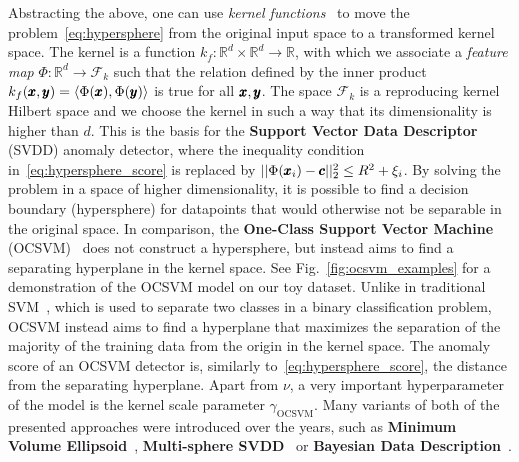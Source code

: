 Abstracting the above, one can use \textit{kernel functions}~\cite{shawe2004kernel} to move the problem~\eqref{eq:hypersphere} from the original input space to a transformed kernel space. The kernel is a function $k_f:\mathbb{R}^d \times \mathbb{R}^d \rightarrow \mathbb{R}$, with which we associate a \textit{feature map} $\Phi: \mathbb{R}^d \rightarrow \mathcal{F}_k$ such that the relation defined by the inner product $k_f(\pmb{{x}},\pmb{{y}})=\langle \Phi(\pmb{{x}}), \Phi(\pmb{{y}}) \rangle$ is true for all $\pmb{{x}},\pmb{{y}}$. The space $\mathcal{F}_k$ is a reproducing kernel Hilbert space and we choose the kernel in such a way that its dimensionality is higher than $d$. This is the basis for the \textbf{Support Vector Data Descriptor} (SVDD) anomaly detector, where the inequality condition in~\eqref{eq:hypersphere_score} is replaced by $\vert \vert \Phi(\pmb{{x}}_i) - \pmb{{c}} \vert \vert_2^2 \leq R^2 + \xi_i$. By solving the problem in a space of higher dimensionality, it is possible to find a decision boundary (hypersphere) for datapoints that would otherwise not be separable in the original space. In comparison, the \textbf{One-Class Support Vector Machine} (OCSVM)~\cite{scholkopf2001estimating} does not construct a hypersphere, but instead aims to find a separating hyperplane in the kernel space. See Fig.~\ref{fig:ocsvm_examples} for a demonstration of the OCSVM model on our toy dataset.  Unlike in traditional SVM~\cite{cortes1995support}, which is used to separate two classes in a binary classification problem, OCSVM instead aims to find a hyperplane that maximizes the separation of the majority of the training data from the origin in the kernel space. The anomaly score of an OCSVM detector is, similarly to~\eqref{eq:hypersphere_score}, the distance from the separating hyperplane. Apart from $\nu$, a very important hyperparameter of the model is the kernel scale parameter $\gamma_{\text{OCSVM}}$. Many variants of both of the presented approaches were introduced over the years, such as \textbf{Minimum Volume Ellipsoid}~\cite{van2009minimum}, \textbf{Multi-sphere SVDD}~\cite{gornitz2017support} or \textbf{Bayesian Data Description}~\cite{ghasemi2012bayesian}.


